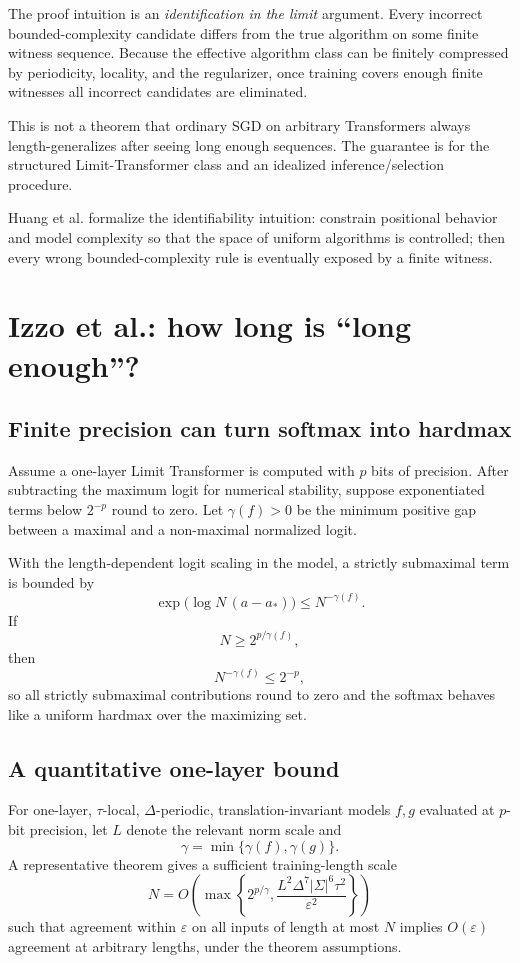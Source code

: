 \documentclass[11pt,a4paper,oneside,openany]{memoir}
\theoremstyle{definition}
\begin{document}
The proof intuition is an \emph{identification in the limit} argument.  Every incorrect bounded-complexity candidate differs from the true algorithm on some finite witness sequence.  Because the effective algorithm class can be finitely compressed by periodicity, locality, and the regularizer, once training covers enough finite witnesses all incorrect candidates are eliminated.

\begin{warningbox}
This is not a theorem that ordinary SGD on arbitrary Transformers always length-generalizes after seeing long enough sequences.  The guarantee is for the structured Limit-Transformer class and an idealized inference/selection procedure.
\end{warningbox}

\begin{presentbox}
Huang et al. formalize the identifiability intuition: constrain positional behavior and model complexity so that the space of uniform algorithms is controlled; then every wrong bounded-complexity rule is eventually exposed by a finite witness.
\end{presentbox}

\chapter{Izzo et al.: how long is ``long enough''?}
\section{Finite precision can turn softmax into hardmax}
Assume a one-layer Limit Transformer is computed with $p$ bits of precision.  After subtracting the maximum logit for numerical stability, suppose exponentiated terms below $2^{-p}$ round to zero.  Let $\gamma(f)>0$ be the minimum positive gap between a maximal and a non-maximal normalized logit.

With the length-dependent logit scaling in the model, a strictly submaximal term is bounded by
\[
\exp\bigl(\log N\,(a-a_*)\bigr)
\le N^{-\gamma(f)}.
\]
If
\[
\boxed{N\ge 2^{p/\gamma(f)}},
\]
then
\[
N^{-\gamma(f)}\le 2^{-p},
\]
so all strictly submaximal contributions round to zero and the softmax behaves like a uniform hardmax over the maximizing set.

\section{A quantitative one-layer bound}
For one-layer, $\tau$-local, $\Delta$-periodic, translation-invariant models $f,g$ evaluated at $p$-bit precision, let $L$ denote the relevant norm scale and
\[
\gamma=\min\{\gamma(f),\gamma(g)\}.
\]
A representative theorem gives a sufficient training-length scale
\[
\boxed{
N=O\!\left(
\max\left\{
2^{p/\gamma},
\frac{L^2\Delta^7|\Sigma|^6\tau^2}{\varepsilon^2}
\right\}
\right)}
\]
such that agreement within $\varepsilon$ on all inputs of length at most $N$ implies $O(\varepsilon)$ agreement at arbitrary lengths, under the theorem assumptions.
\end{document}
